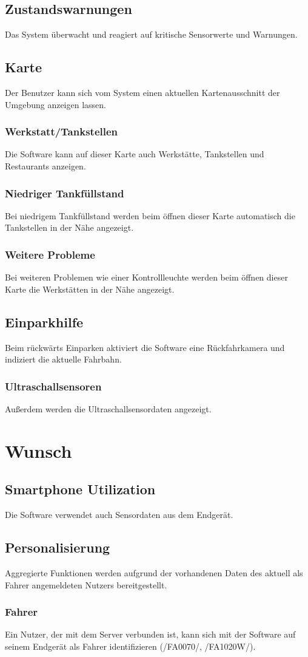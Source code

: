\documentclass[pflichtenheft.tex]{subfiles}
\begin{document}
\subsection{\mkfa Zustandswarnungen}
Das System überwacht und reagiert auf kritische Sensorwerte und Warnungen.

\subsection{\mkfa Karte}
Der Benutzer kann sich vom System einen aktuellen Kartenausschnitt der Umgebung anzeigen lassen.
\subsubsection{\mkfa Werkstatt/Tankstellen}
Die Software kann auf dieser Karte auch Werkstätte, Tankstellen und Restaurants anzeigen.
\subsubsection{\mkfa Niedriger Tankfüllstand}
Bei niedrigem Tankfüllstand werden beim öffnen dieser Karte automatisch die Tankstellen in der Nähe angezeigt.
\subsubsection{\mkfa Weitere Probleme} %
Bei weiteren Problemen wie einer Kontrollleuchte werden beim öffnen dieser Karte die Werkstätten in der Nähe angezeigt.
\subsection{\mkfa Einparkhilfe}
Beim rückwärts Einparken aktiviert die Software eine Rückfahrkamera und indiziert die aktuelle Fahrbahn.
\subsubsection{\mkfa Ultraschallsensoren}
Außerdem werden die Ultraschallsensordaten angezeigt.

\section{Wunsch}

\subsection{\mkfaw Smartphone Utilization} Die Software verwendet auch Sensordaten aus dem Endgerät.
\subsection{\mkfaw Personalisierung} Aggregierte Funktionen werden aufgrund der vorhandenen Daten des aktuell als Fahrer angemeldeten Nutzers bereitgestellt.

\subsubsection{\mkfaw Fahrer} Ein Nutzer, der mit dem Server verbunden ist, kann sich mit der Software auf seinem Endgerät als Fahrer identifizieren (/FA0070/, /FA1020W/).
\end{document}
